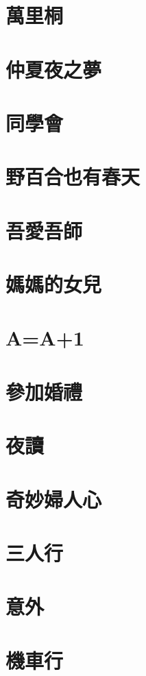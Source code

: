 \documentclass[hyperref]{ctexbook}
\begin{document}
\chapter{萬里桐}
\chapter{仲夏夜之夢}
\chapter{同學會}
\chapter{野百合也有春天}
\chapter{吾愛吾師}
\chapter{媽媽的女兒}
\chapter{A=A+1}
\chapter{參加婚禮}
\chapter{夜讀}
\chapter{奇妙婦人心}
\chapter{三人行}
\chapter{意外}
\chapter{機車行}
\end{document}
